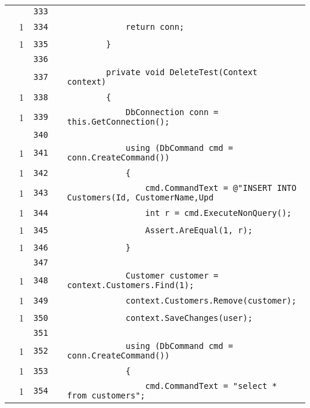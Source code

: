\documentclass[a4paper,10pt]{article}
\begin{document}
\begin{longtable}[l]{lrrll}
\cellcolor{gray} &  & \verb~333~ & & \verb~~\\
\cellcolor{green} & 1 & \verb~334~ & & \verb~            return conn;~\\
\cellcolor{green} & 1 & \verb~335~ & & \verb~        }~\\
\cellcolor{gray} &  & \verb~336~ & & \verb~~\\
\cellcolor{gray} &  & \verb~337~ & & \verb~        private void DeleteTest(Context context)~\\
\cellcolor{green} & 1 & \verb~338~ & & \verb~        {~\\
\cellcolor{green} & 1 & \verb~339~ & & \verb~            DbConnection conn = this.GetConnection();~\\
\cellcolor{gray} &  & \verb~340~ & & \verb~~\\
\cellcolor{green} & 1 & \verb~341~ & & \verb~            using (DbCommand cmd = conn.CreateCommand())~\\
\cellcolor{green} & 1 & \verb~342~ & & \verb~            {~\\
\cellcolor{green} & 1 & \verb~343~ & & \verb~                cmd.CommandText = @"INSERT INTO Customers(Id, CustomerName,Upd~\\
\cellcolor{green} & 1 & \verb~344~ & & \verb~                int r = cmd.ExecuteNonQuery();~\\
\cellcolor{green} & 1 & \verb~345~ & & \verb~                Assert.AreEqual(1, r);~\\
\cellcolor{green} & 1 & \verb~346~ & & \verb~            }~\\
\cellcolor{gray} &  & \verb~347~ & & \verb~~\\
\cellcolor{green} & 1 & \verb~348~ & & \verb~            Customer customer = context.Customers.Find(1);~\\
\cellcolor{green} & 1 & \verb~349~ & & \verb~            context.Customers.Remove(customer);~\\
\cellcolor{green} & 1 & \verb~350~ & & \verb~            context.SaveChanges(user);~\\
\cellcolor{gray} &  & \verb~351~ & & \verb~~\\
\cellcolor{green} & 1 & \verb~352~ & & \verb~            using (DbCommand cmd = conn.CreateCommand())~\\
\cellcolor{green} & 1 & \verb~353~ & & \verb~            {~\\
\cellcolor{green} & 1 & \verb~354~ & & \verb~                cmd.CommandText = "select * from customers";~\\

\end{longtable}
\end{document}
